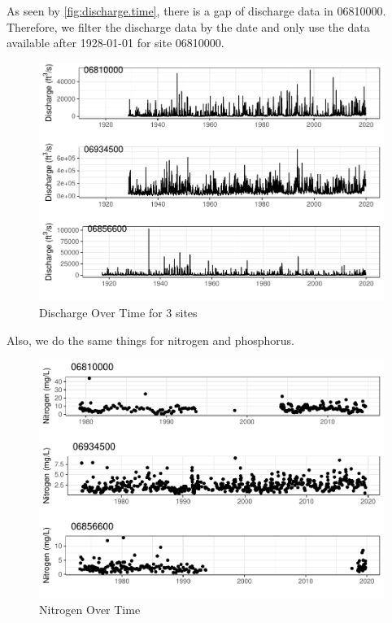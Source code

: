 \documentclass[12pt,]{article}
\begin{document}
As seen by \autoref{fig:discharge.time}, there is a gap of discharge
data in 06810000. Therefore, we filter the discharge data by the date
and only use the data available after 1928-01-01 for site 06810000.

\begin{figure}
\centering
\includegraphics{Project_Template_files/figure-latex/dis.t3-1.pdf}
\caption{\label{fig:dis.t3}Discharge Over Time for 3 sites}
\end{figure}

Also, we do the same things for nitrogen and phosphorus.

\begin{figure}
\centering
\includegraphics{Project_Template_files/figure-latex/N.t-1.pdf}
\caption{\label{fig:N.t}Nitrogen Over Time}
\end{figure}
\end{document}
